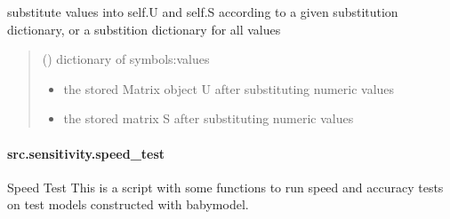\documentclass[letterpaper,10pt,english]{sphinxmanual}
\begin{document}
\begin{fulllineitems}
\begin{fulllineitems}
\label{\detokenize{src.sensitivity.sensitivity_tools:src.sensitivity.sensitivity_tools.SensitivityMatrix.substitute_values}}
\pysigstartsignatures
\pysiglinewithargsret
{}
{}
{}
\pysigstopsignatures
\sphinxAtStartPar
substitute values into self.U and self.S according to a given substitution dictionary, or a substition dictionary for all values
\begin{quote}\begin{description}
\sphinxAtStartPar
{} (\sphinxstyleliteralemphasis{\sphinxupquote{, }}) \textendash{} dictionary of symbols:values

\sphinxAtStartPar
\begin{itemize}
\item {} 
\sphinxAtStartPar
{} \textendash{} the stored Matrix object U after substituting numeric values

\item {} 
\sphinxAtStartPar
{} \textendash{} the stored matrix S after substituting numeric values

\end{itemize}


\end{description}\end{quote}

\end{fulllineitems}


\end{fulllineitems}


\sphinxstepscope


\paragraph{src.sensitivity.speed\_test}
\label{\detokenize{src.sensitivity.speed_test:module-src.sensitivity.speed_test}}\label{\detokenize{src.sensitivity.speed_test:src-sensitivity-speed-test}}\label{\detokenize{src.sensitivity.speed_test::doc}}
\sphinxAtStartPar
Speed Test
This is a script with some functions to run speed and accuracy tests on test models constructed with babymodel.
\end{document}
